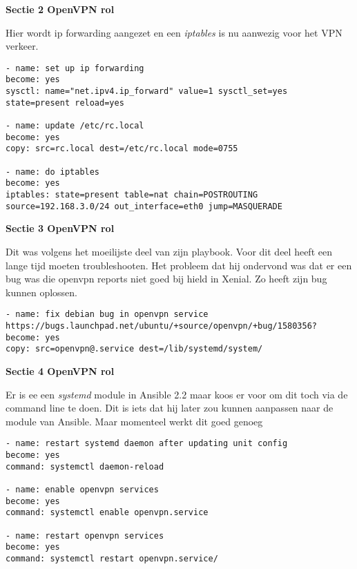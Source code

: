 \textbf{Sectie 2 OpenVPN rol}

Hier wordt ip forwarding aangezet en een \textit{iptables} is nu aanwezig voor het VPN verkeer.
\begin{lstlisting}
- name: set up ip forwarding
become: yes
sysctl: name="net.ipv4.ip_forward" value=1 sysctl_set=yes state=present reload=yes

- name: update /etc/rc.local
become: yes
copy: src=rc.local dest=/etc/rc.local mode=0755

- name: do iptables
become: yes
iptables: state=present table=nat chain=POSTROUTING source=192.168.3.0/24 out_interface=eth0 jump=MASQUERADE
\end{lstlisting}

\textbf{Sectie 3 OpenVPN rol}

Dit was volgens \autocite{scottharney} het moeilijste deel van zijn playbook. Voor dit deel heeft een lange tijd moeten troubleshooten. Het probleem dat hij ondervond was dat er een bug was die openvpn reports niet goed bij hield in Xenial. Zo heeft \autocite{scottharney} zijn bug kunnen oplossen.
\begin{lstlisting}
- name: fix debian bug in openvpn service https://bugs.launchpad.net/ubuntu/+source/openvpn/+bug/1580356?
become: yes
copy: src=openvpn@.service dest=/lib/systemd/system/
\end{lstlisting}

\textbf{Sectie 4 OpenVPN rol}

Er is ee een \textit{systemd} module in Ansible 2.2 maar \autocite{scottharney} koos er voor om dit toch via de command line te doen. Dit is iets dat hij later zou kunnen aanpassen naar de module van Ansible. Maar momenteel werkt dit goed genoeg
\begin{lstlisting}
- name: restart systemd daemon after updating unit config
become: yes
command: systemctl daemon-reload

- name: enable openvpn services
become: yes
command: systemctl enable openvpn.service

- name: restart openvpn services
become: yes
command: systemctl restart openvpn.service/
\end{lstlisting}











